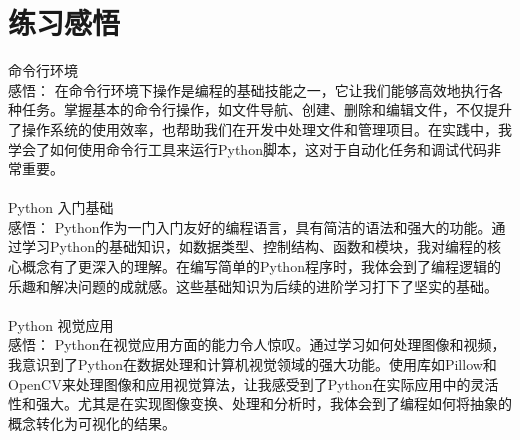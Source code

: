\documentclass[a4paper, 12pt]{article}
\begin{document}
\section{练习感悟}
命令行环境\\
感悟： 在命令行环境下操作是编程的基础技能之一，它让我们能够高效地执行各种任务。掌握基本的命令行操作，如文件导航、创建、删除和编辑文件，不仅提升了操作系统的使用效率，也帮助我们在开发中处理文件和管理项目。在实践中，我学会了如何使用命令行工具来运行Python脚本，这对于自动化任务和调试代码非常重要。\\\\

Python 入门基础\\
感悟： Python作为一门入门友好的编程语言，具有简洁的语法和强大的功能。通过学习Python的基础知识，如数据类型、控制结构、函数和模块，我对编程的核心概念有了更深入的理解。在编写简单的Python程序时，我体会到了编程逻辑的乐趣和解决问题的成就感。这些基础知识为后续的进阶学习打下了坚实的基础。\\\\

Python 视觉应用\\
感悟： Python在视觉应用方面的能力令人惊叹。通过学习如何处理图像和视频，我意识到了Python在数据处理和计算机视觉领域的强大功能。使用库如Pillow和OpenCV来处理图像和应用视觉算法，让我感受到了Python在实际应用中的灵活性和强大。尤其是在实现图像变换、处理和分析时，我体会到了编程如何将抽象的概念转化为可视化的结果。
\end{document}
